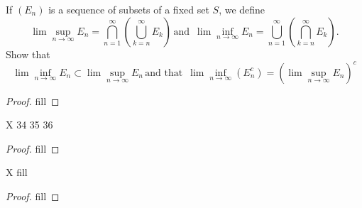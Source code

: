 \begin{exercise}{37}
If $(E_n)$ is a sequence of subsets of a fixed set $S$, we define
\[
\lim\sup_{n\to\infty}E_n=\bigcap_{n=1}^\infty\left(\bigcup_{k=n}^\infty E_k\right)
\,\text{and }\,
\lim\inf_{n\to\infty}E_n=\bigcup_{n=1}^\infty\left(\bigcap_{k=n}^\infty E_k\right).
\]
Show that 
\[
\lim\inf_{n\to\infty}E_n\subset\lim\sup_{n\to\infty}E_n
\,\text{and that }\,
\lim\inf_{n\to\infty}(E_n^c)= \left(\lim\sup_{n\to\infty}E_n\right)^c
\]
\end{exercise}
\begin{proof}
fill
\end{proof}

\begin{exercise}{X}
34
35
36
\end{exercise}
\begin{proof}
fill
\end{proof}

\begin{exercise}{X}
fill
\end{exercise}
\begin{proof}
fill
\end{proof}
